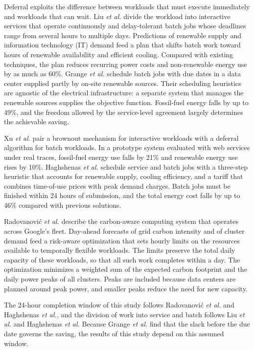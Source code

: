 \documentclass{UNCC-thesis}
\begin{document}
Deferral exploits the difference between workloads that must execute immediately and workloads
that can wait. Liu \emph{et al.} \cite{liu2012renewable} divide the workload into interactive
services that operate continuously and delay-tolerant batch jobs whose deadlines range from
several hours to multiple days. Predictions of renewable supply and information technology (IT)
demand feed a plan that
shifts batch work toward hours of renewable availability and efficient cooling. Compared with
existing techniques, the plan reduces recurring power costs and non-renewable energy use by as
much as 60\%. Grange \emph{et al.} \cite{grange2018green} schedule batch jobs with due dates in a
data center supplied partly by on-site renewable sources. Their scheduling heuristics are
agnostic of the electrical infrastructure: a separate system that manages the renewable sources
supplies the objective function. Fossil-fuel energy falls by up to 49\%, and the freedom allowed by the
service-level agreement largely determines the achievable saving.

Xu \emph{et al.} \cite{xu2021selfadaptive} pair a brownout mechanism for interactive workloads
with a deferral algorithm for batch workloads. In a prototype system evaluated with web services
under real traces, fossil-fuel energy use falls by 21\% and renewable energy use rises by 10\%.
Haghshenas \emph{et al.} \cite{haghshenas2022infrastructure} schedule service and batch jobs with
a three-step heuristic that accounts for renewable supply, cooling efficiency, and a tariff that
combines time-of-use prices with peak demand charges. Batch jobs must be finished within 24 hours
of submission, and the total energy cost falls by up to 46\% compared with previous solutions.

Radovanovi\'{c} \emph{et al.} \cite{radovanovic2021carbonaware} describe the carbon-aware
computing system that operates across Google's fleet. Day-ahead forecasts of grid carbon intensity
and of cluster demand feed a risk-aware optimization that sets hourly limits on the resources
available to temporally flexible workloads. The limits preserve the total daily capacity of these
workloads, so that all such work completes within a day. The optimization minimizes a weighted sum of the expected
carbon footprint and the daily power peaks of all clusters. Peaks are included because data
centers are planned around peak power, and smaller peaks reduce the need for new capacity.

The 24-hour completion window of this study follows Radovanovi\'{c} \emph{et al.} and Haghshenas
\emph{et al.}, and the division of work into service and batch follows Liu \emph{et al.}
\cite{liu2012renewable} and Haghshenas \emph{et al.} Because Grange \emph{et al.} find that the
slack before the due date governs the saving, the results of this study depend on this assumed
window.
\end{document}
